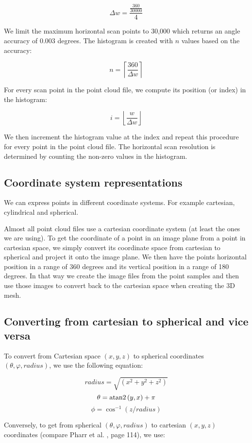 $$ \Delta{w}=  \frac{\frac{360}{30000}}{4} $$

We limit the maximum horizontal scan points to 30,000 which returns an angle accuracy of 0.003 degrees. The histogram is created with $n$ values based on the accuracy:

$$ n = \left\lceil \frac{360}{ \Delta{w} } \right\rceil $$

For every scan point in the point cloud file, we compute its position (or index) in the histogram:

$$ i = \left\lfloor \frac{w}{ \Delta{w} } \right\rfloor $$

We then increment the histogram value at the index and repeat this procedure for every point in the point cloud file. The horizontal scan resolution is determined by counting the non-zero values in the histogram.


\subsection{Coordinate system representations}

We can express points in different coordinate systems. For example cartesian, cylindrical and spherical.

Almost all point cloud files use a cartesian coordinate system (at least the ones we are using). To get the coordinate of a point in an image plane from a point in cartesian space, we simply convert its coordinate space from cartesian to spherical and project it onto the image plane. We then have the points horizontal position in a range of 360 degrees and its vertical position in a range of 180 degrees. In that way we create the image files from the point samples and then use those images to convert back to the cartesian space when creating the 3D mesh.

\subsection{Converting from cartesian to spherical and vice versa}

To convert from Cartesian space {$(x, y, z)$} to spherical coordinates {$(\theta, \varphi, radius)$}, we use the following equation:

$$radius = \sqrt{ (x^2 + y^2 + z^2) } $$
$$\theta = {\rm atan2} \left(y , x\right) + \pi$$
$$\phi = \cos^{-1} (z / radius)$$

Conversely, to get from spherical {$(\theta, \varphi, radius)$} to cartesian {$(x, y, z)$} coordinates (compare Pharr et al. \parencite{Pharr:2010:PBR:1854996}, page 114), we use:

